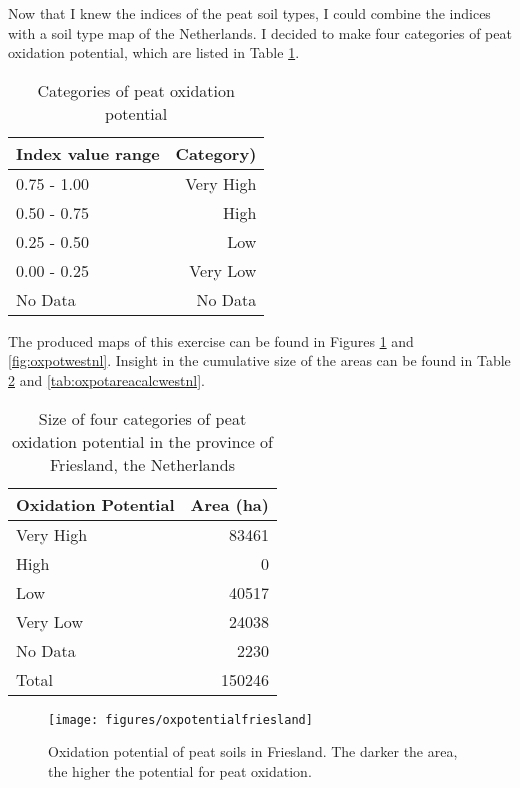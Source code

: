 \documentclass[12pt,a4paper,titlepage]{article}
\begin{document}
Now that I knew the indices of the peat soil types, I could combine the indices with a soil type map of the Netherlands. I decided to make four categories of peat oxidation potential, which are listed in Table \ref{tab:oxpotcategories}.

\begin{table}[htbp]
\caption{Categories of peat oxidation potential}
\begin{center}
\begin{tabular}{|l|r|}
\hline
\textbf{Index value range} & \multicolumn{1}{l|}{\textbf{Category)}} \\ \hline
0.75 - 1.00 & Very High \\ \hline
0.50 - 0.75 & High \\ \hline
0.25 - 0.50 & Low \\ \hline
0.00 - 0.25 & Very Low \\ \hline
No Data & No Data \\ \hline
\end{tabular}
\end{center}
\label{tab:oxpotcategories}
\end{table}

The produced maps of this exercise can be found in Figures \ref{fig:oxpotfriesland} and \ref{fig:oxpotwestnl}. Insight in the cumulative size of the areas can be found in Table \ref{tab:oxpotareacalcfriesland} and \ref{tab:oxpotareacalcwestnl}.

\begin{table}[htbp]
\caption{Size of four categories of peat oxidation potential in the province of Friesland, the Netherlands}
\begin{center}
\begin{tabular}{|l|r|}
\hline
\textbf{Oxidation Potential} & \multicolumn{1}{l|}{\textbf{Area (ha)}} \\ \hline
Very High & 83461 \\ \hline
High & 0 \\ \hline
Low & 40517 \\ \hline
Very Low & 24038 \\ \hline
No Data & 2230 \\ \hline
Total & 150246 \\ \hline
\end{tabular}
\end{center}
\label{tab:oxpotareacalcfriesland}
\end{table}


\begin{figure}
    \centering
    \texttt{[image: figures/oxpotentialfriesland]} 
    \caption{Oxidation potential of peat soils in Friesland. The darker the area, the higher the potential for peat oxidation.}
    \label{fig:oxpotfriesland}
\end{figure}
\end{document}

